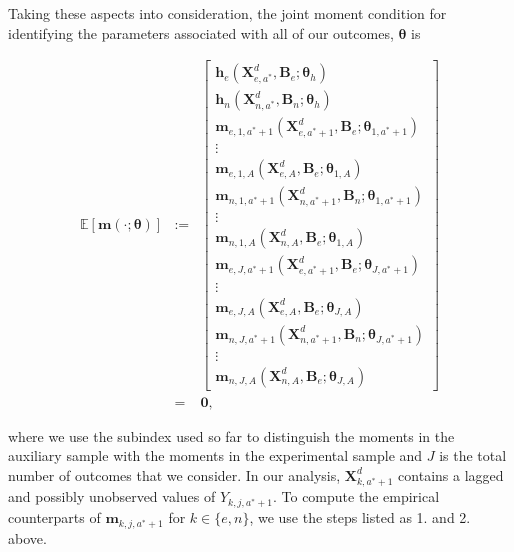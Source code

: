 \noindent Taking these aspects into consideration, the joint moment condition for identifying the parameters associated with all of our outcomes, $\bm{\theta}$ is 




\begin{eqnarray}
\mathbb{E} \left[ \bm{m} \left( \cdot ; \bm{\theta} \right) \right] &:=&
\begin{bmatrix}
 \mathbf{h}_{e} \left(  \bm{X}_{e,a^*}^d, \bm{B}_{e}; \bm{\theta}_{h}  \right) \\  \mathbf{h}_{n} \left(  \bm{X}_{n,a^*}^d, \bm{B}_{n}; \bm{\theta}_{h}  \right) \\
\bm{m}_{e,1,a^*+1} \left( \bm{X}_{e,a^*+1}^d, \bm{B}_{e}; \bm{\theta}_{1,a^*+1} \right) \\ \vdots \\  \bm{m}_{e,1,A} \left( \bm{X}_{e,A}^d, \bm{B}_{e}; \bm{\theta}_{1,A} \right) \\
\bm{m}_{n,1,a^*+1} \left( \bm{X}_{n,a^*+1}^d, \bm{B}_{n}; \bm{\theta}_{1,a^*+1} \right) \\ \vdots \\  \bm{m}_{n,1,A} \left( \bm{X}_{n,A}^d, \bm{B}_{e}; \bm{\theta}_{1,A} \right) \\
\bm{m}_{e,J,a^*+1} \left( \bm{X}_{e,a^*+1}^d, \bm{B}_{e}; \bm{\theta}_{J,a^*+1} \right) \\ \vdots \\  \bm{m}_{e,J,A} \left( \bm{X}_{e,A}^d, \bm{B}_{e}; \bm{\theta}_{J,A} \right) \\
\bm{m}_{n,J,a^*+1} \left( \bm{X}_{n,a^*+1}^d, \bm{B}_{n}; \bm{\theta}_{J,a^*+1} \right) \\ \vdots \\  \bm{m}_{n,J,A} \left( \bm{X}_{n,A}^d, \bm{B}_{e}; \bm{\theta}_{J,A} \right) 
 \label{eq:loss}
\end{bmatrix}  \\ \nonumber
&=& \bm{0}, \label{eq:MOMENT}
\end{eqnarray}

\noindent where we use the subindex used so far to distinguish the moments in the auxiliary sample with the moments in the experimental sample and $J$ is the total number of outcomes that we consider. In our analysis, $\bm{X}_{k,a^*+1}^d$ contains a lagged and possibly unobserved values of $Y_{k,j,a^*+1}$. To compute the empirical counterparts of $\bm{m}_{k,j,a^*+1}$ for $k \in \{e, n\}$, we use the steps listed as 1. and 2. above.\\

